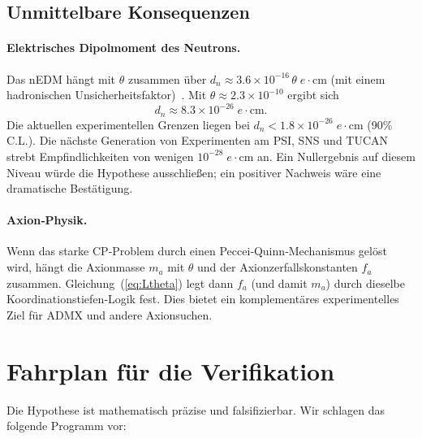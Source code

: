 \documentclass[12pt,a4paper]{article}
\begin{document}
	\subsection{Unmittelbare Konsequenzen}
	
	\paragraph{Elektrisches Dipolmoment des Neutrons.}
	Das nEDM hängt mit \(\theta\) zusammen über \(d_n \approx 3.6 \times 10^{-16}\,\theta\; e\!\cdot\!\mathrm{cm}\) (mit einem hadronischen Unsicherheitsfaktor)~\cite{nEDM2020}. Mit \(\theta \approx 2.3 \times 10^{-10}\) ergibt sich
	\[
	d_n \approx 8.3 \times 10^{-26}\; e\!\cdot\!\mathrm{cm}.
	\]
	Die aktuellen experimentellen Grenzen liegen bei \(d_n < 1.8 \times 10^{-26}\; e\!\cdot\!\mathrm{cm}\) (90\% C.L.). Die nächste Generation von Experimenten am PSI, SNS und TUCAN strebt Empfindlichkeiten von wenigen \(10^{-28}\; e\!\cdot\!\mathrm{cm}\) an. Ein Nullergebnis auf diesem Niveau würde die Hypothese ausschließen; ein positiver Nachweis wäre eine dramatische Bestätigung.
	
	\paragraph{Axion‑Physik.}
	Wenn das starke CP‑Problem durch einen Peccei‑Quinn‑Mechanismus gelöst wird, hängt die Axionmasse \(m_a\) mit \(\theta\) und der Axionzerfallskonstanten \(f_a\) zusammen. Gleichung~(\ref{eq:Ltheta}) legt dann \(f_a\) (und damit \(m_a\)) durch dieselbe Koordinationstiefen‑Logik fest. Dies bietet ein komplementäres experimentelles Ziel für ADMX und andere Axionsuchen.
	
	\section{Fahrplan für die Verifikation}
	\label{sec:roadmap}
	
	Die Hypothese ist mathematisch präzise und falsifizierbar. Wir schlagen das folgende Programm vor:
	
\end{document}
